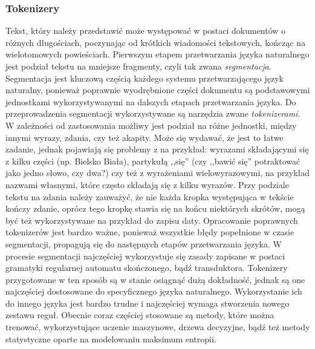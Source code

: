 \documentclass[a4paper, twoside, 12pt]{report}
\begin{document}
            \subsubsection{Tokenizery}
                Tekst, który należy przedstawić może występować w postaci dokumentów o różnych długościach, poczynając od
                krótkich wiadomości tekstowych, kończąc na wielotomowych powieściach. Pierwszym etapem przetwarzania języka
                naturalnego jest podział tekstu na mniejsze fragmenty, czyli tak zwana \emph{segmentacja}. Segmentacja jest
                kluczową częścią każdego systemu przetwarzającego język naturalny, ponieważ poprawnie wyodrębnione części
                dokumentu są podstawowymi jednostkami wykorzystywanymi na dalszych etapach przetwarzania języka.
                Do przeprowadzenia segmentacji wykorzystywane są narzędzia zwane
                \emph{tokenizerami}.%
                W zależności od zastosowania możliwy jest podział na różne jednostki, między innymi wyrazy, zdania, czy też akapity.
                Może się wydawać, że jest to łatwe zadanie, jednak pojawiają się problemy z na przykład: wyrazami składającymi
                się z kilku części (np. Bielsko Biała), partykułą ,,się'' (czy ,,bawić się'' potraktować jako jedno słowo, czy dwa?)
                czy też z wyrażeniami wielowyrazowymi, na przykład nazwami własnymi, które często składają się z kilku wyrazów.
                Przy podziale tekstu na zdania należy zauważyć, że nie każda kropka występująca w tekście kończy zdanie, oprócz
                tego kropkę stawia się na końcu niektórych skrótów, mogą być też wykorzystywane na przykład do zapisu daty.
                Opracowanie poprawnych tokenizerów jest bardzo ważne, ponieważ wszystkie błędy popełnione w czasie segmentacji,
                propagują się do następnych etapów przetwarzania języka. W procesie segmentacji najczęściej wykorzystuje się
                zasady zapisane w postaci gramatyki regularnej automatu skończonego, bądź transduktora. Tokenizery przygotowane
                w ten sposób są w stanie osiągnąć dużą dokładność, jednak są one najczęściej dostosowane do specyficznego języka
                naturalnego. Wykorzystanie ich do innego języka jest bardzo trudne i najczęściej wymaga stworzenia nowego
                zestawu reguł. Obecnie coraz częściej stosowane są metody, które można trenować, wykorzystujące uczenie maszynowe,
                drzewa decyzyjne, bądź też metody statystyczne oparte na modelowaniu maksimum entropii\cite{HANDBOOKNLP}.
\end{document}
